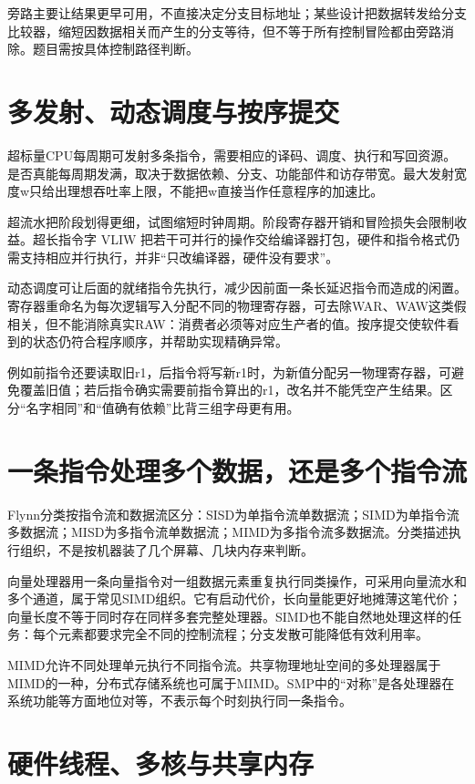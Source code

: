 旁路主要让结果更早可用，不直接决定分支目标地址；某些设计把数据转发给分支比较器，缩短因数据相关而产生的分支等待，但不等于所有控制冒险都由旁路消除。题目需按具体控制路径判断。

\section{多发射、动态调度与按序提交}\label{CO05-issue}

超标量CPU每周期可发射多条指令，需要相应的译码、调度、执行和写回资源。是否真能每周期发满，取决于数据依赖、分支、功能部件和访存带宽。最大发射宽度w只给出理想吞吐率上限，不能把w直接当作任意程序的加速比。

超流水把阶段划得更细，试图缩短时钟周期。阶段寄存器开销和冒险损失会限制收益。超长指令字 VLIW 把若干可并行的操作交给编译器打包，硬件和指令格式仍需支持相应并行执行，并非``只改编译器，硬件没有要求''。

动态调度可让后面的就绪指令先执行，减少因前面一条长延迟指令而造成的闲置。寄存器重命名为每次逻辑写入分配不同的物理寄存器，可去除WAR、WAW这类假相关，但不能消除真实RAW：消费者必须等对应生产者的值。按序提交使软件看到的状态仍符合程序顺序，并帮助实现精确异常。

例如前指令还要读取旧r1，后指令将写新r1时，为新值分配另一物理寄存器，可避免覆盖旧值；若后指令确实需要前指令算出的r1，改名并不能凭空产生结果。区分``名字相同''和``值确有依赖''比背三组字母更有用。

\section{一条指令处理多个数据，还是多个指令流}\label{CO05-flynn}

Flynn分类按指令流和数据流区分：SISD为单指令流单数据流；SIMD为单指令流多数据流；MISD为多指令流单数据流；MIMD为多指令流多数据流。分类描述执行组织，不是按机器装了几个屏幕、几块内存来判断。

向量处理器用一条向量指令对一组数据元素重复执行同类操作，可采用向量流水和多个通道，属于常见SIMD组织。它有启动代价，长向量能更好地摊薄这笔代价；向量长度不等于同时存在同样多套完整处理器。SIMD也不能自然地处理这样的任务：每个元素都要求完全不同的控制流程；分支发散可能降低有效利用率。

MIMD允许不同处理单元执行不同指令流。共享物理地址空间的多处理器属于MIMD的一种，分布式存储系统也可属于MIMD。SMP中的``对称''是各处理器在系统功能等方面地位对等，不表示每个时刻执行同一条指令。

\section{硬件线程、多核与共享内存}\label{CO05-multithread}

